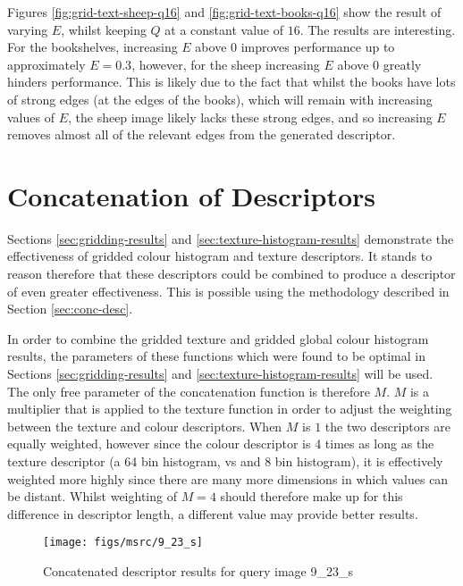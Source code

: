 Figures \ref{fig:grid-text-sheep-q16} and \ref{fig:grid-text-books-q16} show the result of varying $E$, whilst keeping $Q$ at a constant value of $16$. The results are interesting. For the bookshelves, increasing $E$ above $0$ improves performance up to approximately $E=0.3$, however, for the sheep increasing $E$ above $0$ greatly hinders performance. This is likely due to the fact that whilst the books have lots of strong edges (at the edges of the books), which will remain with increasing values of $E$, the sheep image likely lacks these strong edges, and so increasing $E$ removes almost all of the relevant edges from the generated descriptor.

\FloatBarrier
\section{Concatenation of Descriptors} \label{sec:conc-desc-results}
Sections \ref{sec:gridding-results} and \ref{sec:texture-histogram-results} demonstrate the effectiveness of gridded colour histogram and texture descriptors. It stands to reason therefore that these descriptors could be combined to produce a descriptor of even greater effectiveness. This is possible using the methodology described in Section \ref{sec:conc-desc}.

In order to combine the gridded texture and gridded global colour histogram results, the parameters of these functions which were found to be optimal in Sections \ref{sec:gridding-results} and \ref{sec:texture-histogram-results} will be used. The only free parameter of the concatenation function is therefore $M$. $M$ is a multiplier that is applied to the texture function in order to adjust the weighting between the texture and colour descriptors. When $M$ is $1$ the two descriptors are equally weighted, however since the colour descriptor is 4 times as long as the texture descriptor (a 64 bin histogram, vs and 8 bin histogram), it is effectively weighted more highly since there are many more dimensions in which values can be distant. Whilst weighting of $M=4$ should therefore make up for this difference in descriptor length, a different value may provide better results.

\begin{figure}[ht]
	\begin{minipage}[]{0.3\linewidth}
		\centering
		\texttt{[image: figs/msrc/9\_23\_s]}
	\end{minipage}
	\begin{minipage}[]{0.7\linewidth}
		\centering
	\end{minipage}
	\caption{Concatenated descriptor results for query image 9\_23\_s}
	\label{fig:concat-sheep}
\end{figure}

